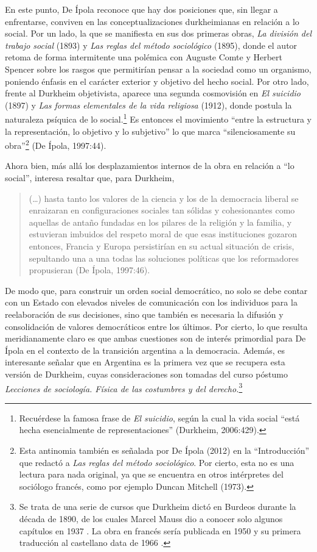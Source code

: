 En este punto, De Ípola reconoce que hay dos posiciones que, sin llegar a enfrentarse, conviven en las conceptualizaciones durkheimianas en relación a lo social. Por un lado, la que se manifiesta en sus dos primeras obras, \emph{La división del trabajo social} (1893) y \emph{Las reglas del método sociológico} (1895), donde el autor retoma de forma intermitente una polémica con Auguste Comte y Herbert Spencer sobre los rasgos que permitirían pensar a la sociedad como un organismo, poniendo énfasis en el carácter exterior y objetivo del hecho social. Por otro lado, frente al Durkheim objetivista, aparece una segunda cosmovisión en \emph{El suicidio} (1897) y \emph{Las formas elementales de la vida religiosa} (1912), donde postula la naturaleza psíquica de lo social.\footnote{Recuérdese la famosa frase de \emph{El suicidio}, según la cual la vida social ``está hecha esencialmente de representaciones'' (Durkheim, 2006:429).} Es entonces el movimiento ``entre la estructura y la representación, lo objetivo y lo subjetivo'' lo que marca ``silenciosamente su obra''\footnote{Esta antinomia también es señalada por De Ípola (2012) en la ``Introducción'' que redactó a \emph{Las reglas del método sociológico}. Por cierto, esta no es una lectura para nada original, ya que se encuentra en otros intérpretes del sociólogo francés, como por ejemplo Duncan Mitchell (1973).} (De Ípola, 1997:44).

Ahora bien, más allá los desplazamientos internos de la obra en relación a ``lo social'', interesa resaltar que, para Durkheim,

\begin{quote}
(\dots) hasta tanto los valores de la ciencia y los de la democracia liberal se enraizaran en configuraciones sociales tan sólidas y cohesionantes como aquellas de antaño fundadas en los pilares de la religión y la familia, y estuvieran imbuidos del respeto moral de que esas instituciones gozaron entonces, Francia y Europa persistirían en su actual situación de crisis, sepultando una a una todas las soluciones políticas que los reformadores propusieran (De Ípola, 1997:46).
\end{quote}

De modo que, para construir un orden social democrático, no solo se debe contar con un Estado con elevados niveles de comunicación con los individuos para la reelaboración de sus decisiones, sino que también es necesaria la difusión y consolidación de valores democráticos entre los últimos. Por cierto, lo que resulta meridianamente claro es que ambas cuestiones son de interés primordial para De Ípola en el contexto de la transición argentina a la democracia. Además, es interesante señalar que en Argentina es la primera vez que se recupera esta versión de Durkheim, cuyas consideraciones son tomadas del curso póstumo \emph{Lecciones de sociología. Física de las costumbres y del derecho.}\footnote{Se trata de una serie de cursos que Durkheim dictó en Burdeos durante la década de 1890, de los cuales Marcel Mauss dio a conocer solo algunos capítulos en 1937 \parencite{1443-BOUGLE1938}. La obra en francés sería publicada en 1950 y su primera traducción al castellano data de 1966 \parencite{1449-CATANO1998}.}

